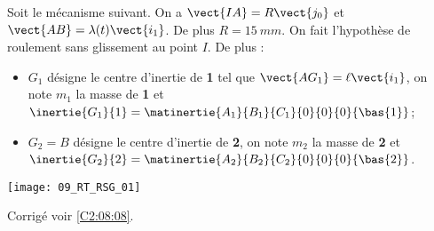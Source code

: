 \normalfalse \difficiletrue \tdifficilefalse
\correctionfalse


\setcounter{question}{0}
\ifcorrection
\else
{}
\fi

\ifprof
\else
Soit le mécanisme suivant. On a $\vect{IA}=R\vect{j_0}$ et $\vect{AB}=\lambda(t)\vect{i_1}$. De plus $R=\SI{15}{mm}$.
On fait l'hypothèse de roulement sans glissement au point $I$. De plus :
\begin{itemize}
\item $G_1$ désigne le centre d'inertie de \textbf{1} tel que $\vect{AG_1}=\ell\vect{i_1}$, on note $m_1$ la masse de \textbf{1} et $\inertie{G_1}{1}=\matinertie{A_1}{B_1}{C_1}{0}{0}{0}{\bas{1}}$; 
\item $G_2=B$ désigne le centre d'inertie de \textbf{2}, on note $m_2$ la masse de \textbf{2} et $\inertie{G_2}{2}=\matinertie{A_2}{B_2}{C_2}{0}{0}{0}{\bas{2}}$.
\end{itemize}
\begin{center}
\texttt{[image: 09\_RT\_RSG\_01]}
\end{center}
\fi

\ifprof
\else
\fi

\ifprof
\else
\fi


\ifprof
\else
\begin{flushright}
\footnotesize{Corrigé  voir \ref{C2:08:08}.}
\end{flushright}%
\fi